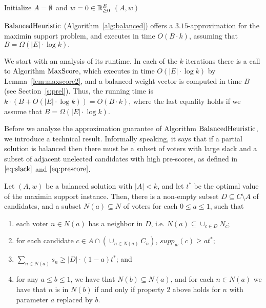 \begin{algorithm}[htb]\label{alg:balanced}
\SetAlgoLined
{}
Initialize $A=\emptyset$\ and $w=0\in\mathbb{R}_{\geq 0}^E$\;
\Return $(A,w)$\;
\caption{$\balanced$}
\end{algorithm}

\begin{theorem}\label{thm:315}
$\balanced$ (Algorithm~\ref{alg:balanced}) offers a $3.15$-approximation for the maximin support problem, and executes in time $O(B\cdot k)$, assuming that $B= \Omega(|E|\cdot\log k).$
\end{theorem}

We start with an analysis of its runtime. In each of the $k$ iterations there is a call to Algorithm $\operatorname{MaxScore}$, which executes in time $O(|E|\cdot \log k)$ by Lemma~\ref{lem:maxscore2}, and a balanced weight vector is computed in time $B$ (see Section~\ref{s:prel}). Thus, the running time is $k\cdot (B+O(|E|\cdot \log k))=O(B\cdot k)$, where the last equality holds if we assume that $B=\Omega(|E|\cdot \log k)$. 

Before we analyze the approximation guarantee of Algorithm $\balanced$, we introduce a technical result. 
Informally speaking, it says that if a partial solution is balanced then there must be a subset of voters with large slack and a subset of adjacent unelected candidates with high pre-scores, as defined in $\eqref{eq:slack}$ and $\eqref{eq:prescore}$.

\begin{lemma}\label{lem:N_a}
Let $(A,w)$ be a balanced solution with $|A|< k$, and let $t^*$ be the optimal value of the maximin support instance. 
Then, there is a non-empty subset $D\subseteq C\setminus A$ of candidates, and a subset $N(a)\subseteq N$ of voters for each $0\leq a \leq 1$, such that 
\begin{enumerate}
    \item each voter $n\in N(a)$ has a neighbor in $D$, i.e. $N(a)\subseteq \cup_{c\in D}N_c$; 
     \item for each candidate $c\in A\cap(\cup_{n\in N(a)} C_n)$, $supp_w(c)\geq at^*$;
     \item $\sum_{n\in N(a)} s_n \geq |D|\cdot (1-a) t^*$; and
     \item for any $a\leq b\leq 1$, we have that $N(b)\subseteq N(a)$, and for each $n\in N(a)$ we have that $n$ is in $N(b)$ if and only if property 2 above holds for $n$ with parameter $a$ replaced by $b$. 
\end{enumerate}
\end{lemma}


